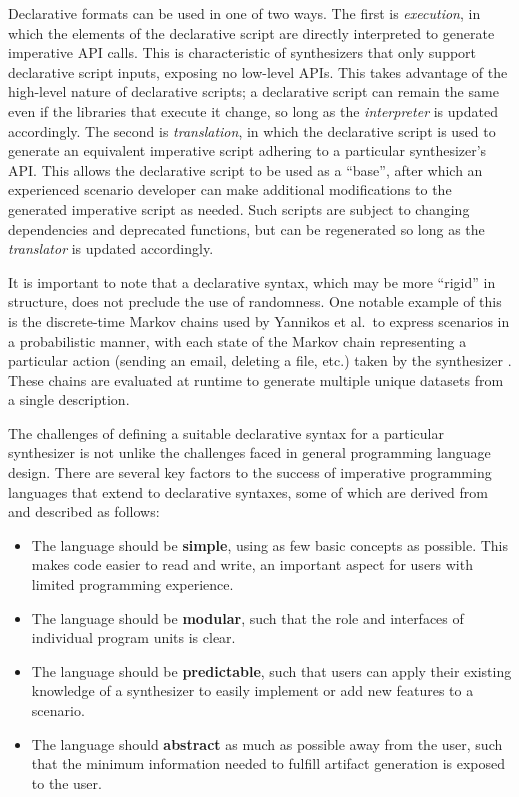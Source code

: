 Declarative formats can be used in one of two ways. The first is
\emph{execution}, in which the elements of the declarative script are
directly interpreted to generate imperative API calls. This is
characteristic of synthesizers that only support declarative script
inputs, exposing no low-level APIs. This takes advantage of the
high-level nature of declarative scripts; a declarative script can
remain the same even if the libraries that execute it change, so long as
the \emph{interpreter} is updated accordingly. The second is
\emph{translation}, in which the declarative script is used to generate
an equivalent imperative script adhering to a particular synthesizer's
API. This allows the declarative script to be used as a ``base'', after
which an experienced scenario developer can make additional
modifications to the generated imperative script as needed. Such scripts
are subject to changing dependencies and deprecated functions, but can
be regenerated so long as the \emph{translator} is updated accordingly.

It is important to note that a declarative syntax, which may be more
``rigid'' in structure, does not preclude the use of randomness. One
notable example of this is the discrete-time Markov chains used by
Yannikos et al.~to express scenarios in a probabilistic manner, with
each state of the Markov chain representing a particular action (sending
an email, deleting a file, etc.) taken by the synthesizer
\cite{yannikosDataCorporaDigital2014}. These chains are evaluated at
runtime to generate multiple unique datasets from a single description.

The challenges of defining a suitable declarative syntax for a
particular synthesizer is not unlike the challenges faced in general
programming language design. There are several key factors to the
success of imperative programming languages that extend to declarative
syntaxes, some of which are derived from \cite{finkel1996advanced}
and described as follows:

\begin{itemize}
\tightlist
\item
  The language should be \textbf{simple}, using as few basic concepts as
  possible. This makes code easier to read and write, an important
  aspect for users with limited programming experience.\\
\item
  The language should be \textbf{modular}, such that the role and
  interfaces of individual program units is clear.
\item
  The language should be \textbf{predictable}, such that users can apply
  their existing knowledge of a synthesizer to easily implement or add
  new features to a scenario.\\
\item
  The language should \textbf{abstract} as much as possible away from
  the user, such that the minimum information needed to fulfill artifact
  generation is exposed to the user.
\end{itemize}


